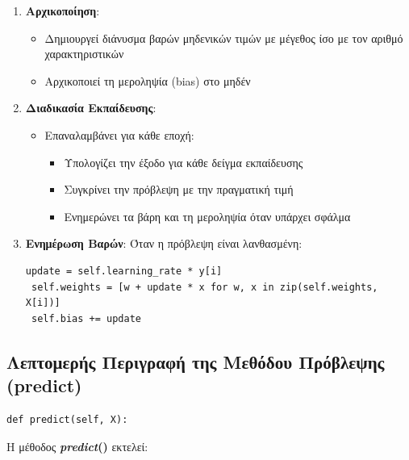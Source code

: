 \documentclass[12pt,a4paper,twoside]{book}
\begin{document}
\begin{enumerate}
    \item \textbf{Αρχικοποίηση}:
    \begin{itemize}
        \item Δημιουργεί διάνυσμα βαρών μηδενικών τιμών με μέγεθος ίσο με τον αριθμό χαρακτηριστικών
        \item Αρχικοποιεί τη μεροληψία (bias) στο μηδέν
    \end{itemize}
    \item \textbf{Διαδικασία Εκπαίδευσης}:
    \begin{itemize}
        \item Επαναλαμβάνει για κάθε εποχή:
        \begin{itemize}
            \item Υπολογίζει την έξοδο για κάθε δείγμα εκπαίδευσης
            \item Συγκρίνει την πρόβλεψη με την πραγματική τιμή
            \item Ενημερώνει τα βάρη και τη μεροληψία όταν υπάρχει σφάλμα
        \end{itemize}
    \end{itemize}
    \item \textbf{Ενημέρωση Βαρών}:
    Όταν η πρόβλεψη είναι λανθασμένη:
    \begin{tcolorbox}[myCustomStyle = {perceptron.py}]
        \begin{lstlisting}[style=myPythonStyle]
 update = self.learning_rate * y[i]
 self.weights = [w + update * x for w, x in zip(self.weights, X[i])]
 self.bias += update
        \end{lstlisting}
    \end{tcolorbox}
\end{enumerate}

\subsection{Λεπτομερής Περιγραφή της Μεθόδου Πρόβλεψης (predict)}

\begin{tcolorbox}[myCustomStyle = {perceptron.py}]
    \begin{lstlisting}[style=myPythonStyle]
 def predict(self, X):
    \end{lstlisting}
\end{tcolorbox}

Η μέθοδος \textbf{\textit{predict}()} εκτελεί: %
\end{document}
